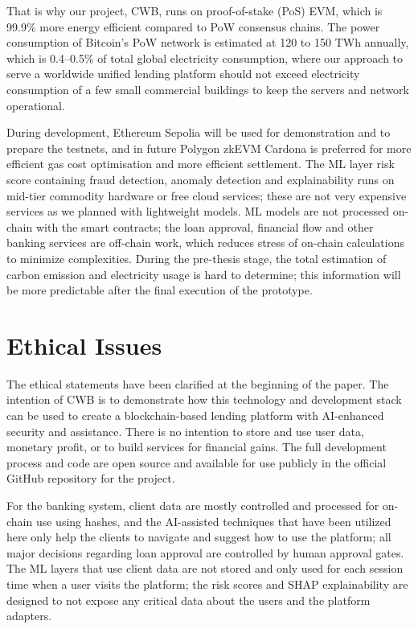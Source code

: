 \documentclass[12pt,a4paper]{report}
\begin{document}
That is why our project, CWB, runs on proof-of-stake (PoS) EVM, which is 99.9\% more energy efficient compared to PoW consensus chains. The power consumption of Bitcoin's PoW network is estimated at 120 to 150 TWh annually, which is 0.4--0.5\% of total global electricity consumption, where our approach to serve a worldwide unified lending platform should not exceed electricity consumption of a few small commercial buildings to keep the servers and network operational.

During development, Ethereum Sepolia will be used for demonstration and to prepare the testnets, and in future Polygon zkEVM Cardona is preferred for more efficient gas cost optimisation and more efficient settlement. The ML layer risk score containing fraud detection, anomaly detection and explainability runs on mid-tier commodity hardware or free cloud services; these are not very expensive services as we planned with lightweight models. ML models are not processed on-chain with the smart contracts; the loan approval, financial flow and other banking services are off-chain work, which reduces stress of on-chain calculations to minimize complexities. During the pre-thesis stage, the total estimation of carbon emission and electricity usage is hard to determine; this information will be more predictable after the final execution of the prototype.

\section{Ethical Issues}
\label{sec:ethical-issues}
The ethical statements have been clarified at the beginning of the paper. The intention of CWB is to demonstrate how this technology and development stack can be used to create a blockchain-based lending platform with AI-enhanced security and assistance. There is no intention to store and use user data, monetary profit, or to build services for financial gains. The full development process and code are open source and available for use publicly in the official GitHub repository for the project.

For the banking system, client data are mostly controlled and processed for on-chain use using hashes, and the AI-assisted techniques that have been utilized here only help the clients to navigate and suggest how to use the platform; all major decisions regarding loan approval are controlled by human approval gates. The ML layers that use client data are not stored and only used for each session time when a user visits the platform; the risk scores and SHAP explainability are designed to not expose any critical data about the users and the platform adapters.
\end{document}
